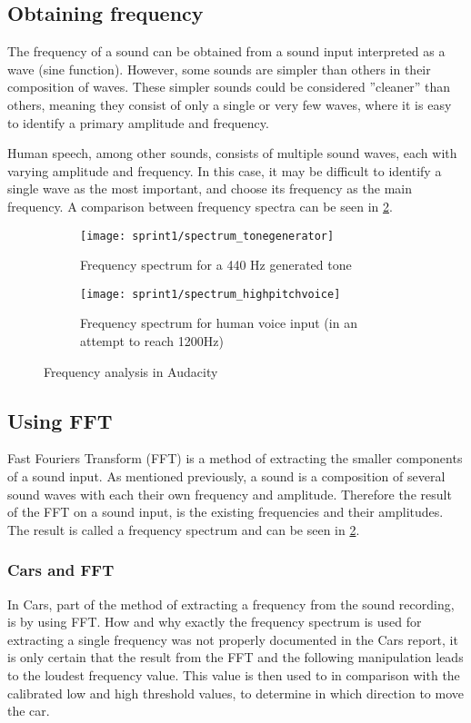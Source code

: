 \subsection{Obtaining frequency}\label{obtaining_frequency}
The frequency of a sound can be obtained from a sound input interpreted as a wave (sine function).
However, some sounds are simpler than others in their composition of waves.
These simpler sounds could be considered ''cleaner'' than others, meaning they consist of only a single or very few waves, where it is easy to identify a primary amplitude and frequency.

Human speech, among other sounds, consists of multiple sound waves, each with varying amplitude and frequency.
In this case, it may be difficult to identify a single wave as the most important, and choose its frequency as the main frequency.
A comparison between frequency spectra can be seen in \cref{fig:frequency_spectra}.

\begin{figure}[h]
\centering
\begin{subfigure}[t]{.45\textwidth}
\texttt{[image: sprint1/spectrum\_tonegenerator]}
\caption{Frequency spectrum for a 440 Hz generated tone}
\end{subfigure}
\begin{subfigure}[t]{.45\textwidth}
\texttt{[image: sprint1/spectrum\_highpitchvoice]}
\caption{Frequency spectrum for human voice input (in an attempt to reach 1200Hz)}
\label{fig:humanvoice_spectra}
\end{subfigure}
\caption{Frequency analysis in Audacity}
\label{fig:frequency_spectra}
\end{figure}

\subsection{Using FFT}
Fast Fouriers Transform (FFT) is a method of extracting the smaller components of a sound input.
As mentioned previously, a sound is a composition of several sound waves with each their own frequency and amplitude.
Therefore the result of the FFT on a sound input, is the existing frequencies and their amplitudes.
The result is called a frequency spectrum and can be seen in \cref{fig:frequency_spectra}.

\subsubsection{Cars and FFT}
In Cars, part of the method of extracting a frequency from the sound recording, is by using FFT.
How and why exactly the frequency spectrum is used for extracting a single frequency was not properly documented in the Cars report, it is only certain that the result from the FFT and the following manipulation leads to the loudest frequency value.
This value is then used to in comparison with the calibrated low and high threshold values, to determine in which direction to move the car.


